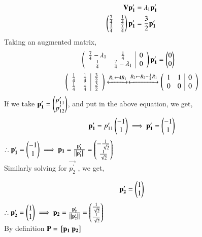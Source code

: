 \documentclass[journal]{IEEEtran}
\begin{document}
\begin{align}
	\mathbf{V}\mathbf{p_1^\prime} &= \lambda_1 \mathbf{p_1^\prime} \\
	\begin{pmatrix}\frac{7}{4} & \frac{1}{4} \\ \frac{1}{4} & \frac{7}{4}\end{pmatrix} \mathbf{p_1^\prime}  &= \frac{3}{2}\mathbf{p_1^\prime} \\
\end{align}
Taking an augmented matrix,
\begin{align}
	\left(
	\begin{array}{cc|c}
		\frac{7}{4} - \lambda_1 & \frac{1}{4} & 0\\ 
		\frac{1}{4} & \frac{7}{4} - \lambda_1& 0
	\end{array}\right)\mathbf{p_1^\prime}  &=  \begin{pmatrix}0 \\ 0\end{pmatrix} 
\end{align}
\begin{align}
	\left(
	\begin{array}{cc|c}
		\frac{1}{4} & \frac{1}{4} & \frac{3}{2}\\ 
		\frac{1}{4} & \frac{1}{4} & \frac{3}{2}
	\end{array}\right)
	\xleftrightarrow[]{R_1 \leftarrow {4 R_1}}
	\xleftrightarrow[]{R_2 \leftarrow {R_2-\frac{1}{4}R_1}}
	\left(
	\begin{array}{cc|c}
		1 & 1 & 0\\ 
		0 & 0 & 0
		\end{array}\right)
\end{align}
If we take $\mathbf{p_1^\prime}  = \begin{pmatrix}p_{11}^\prime \\ p_{12}^\prime\end{pmatrix}$, and put in the above equation, we get,
\begin{align}
	\mathbf{p_1^\prime} = p_{11}^\prime \begin{pmatrix}-1 \\ 1\end{pmatrix} \implies \mathbf{p_1^\prime} =  \begin{pmatrix}-1 \\ 1\end{pmatrix}
\end{align}
$\therefore \mathbf{p_1^\prime}  = \begin{pmatrix}-1 \\ 1\end{pmatrix} \implies \mathbf{p_1} = \frac{\mathbf{p_1^\prime} }{\left\lVert\mathbf{p_1^\prime}\right\rVert}  = \begin{pmatrix} -\frac{1}{\sqrt{2}} \\ \frac{1}{\sqrt{2}}\end{pmatrix}$ \\
Similarly solving for $\vec{p_2^\prime}$ , we get,

\begin{align}
	\mathbf{p_2^\prime} &=  \begin{pmatrix}1 \\ 1\end{pmatrix} \\
\end{align} 
$\therefore \mathbf{p_2^\prime}  = \begin{pmatrix}1 \\ 1\end{pmatrix} \implies \mathbf{p_2} = \frac{\mathbf{p_2^\prime} }{\left\lVert\mathbf{p_2^\prime}\right\rVert}  = \begin{pmatrix} \frac{1}{\sqrt{2}} \\ \frac{1}{\sqrt{2}}\end{pmatrix}$ \\
By definition $\mathbf{P} = {}\left[\mathbf{p_1} ~ \mathbf{p_2}\right]$ \\ 
\end{document}
